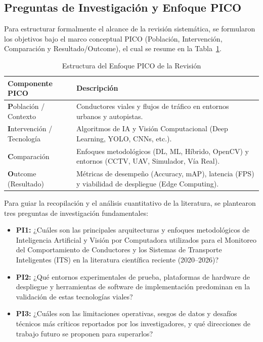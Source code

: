 \subsection{Preguntas de Investigación y Enfoque PICO}
Para estructurar formalmente el alcance de la revisión sistemática, se formularon los objetivos bajo el marco conceptual PICO (Población, Intervención, Comparación y Resultado/Outcome), el cual se resume en la Tabla~\ref{tab:pico}.

\begin{table}[htbp]
\centering
\renewcommand{\arraystretch}{1.3}
\caption{Estructura del Enfoque PICO de la Revisión}
\label{tab:pico}
\begin{tabular}{@{}p{2.2cm}p{6.2cm}@{}}
\toprule
\textbf{Componente PICO} & \textbf{Descripción} \\
\midrule
\textbf{P}oblación / Contexto & Conductores viales y flujos de tráfico en entornos urbanos y autopistas. \\
\textbf{I}ntervención / Tecnología & Algoritmos de IA y Visión Computacional (Deep Learning, YOLO, CNNs, etc.). \\
\textbf{C}omparación & Enfoques metodológicos (DL, ML, Híbrido, OpenCV) y entornos (CCTV, UAV, Simulador, Vía Real). \\
\textbf{O}utcome (Resultado) & Métricas de desempeño (Accuracy, mAP), latencia (FPS) y viabilidad de despliegue (Edge Computing). \\
\bottomrule
\end{tabular}
\end{table}

Para guiar la recopilación y el análisis cuantitativo de la literatura, se plantearon tres preguntas de investigación fundamentales:
\begin{itemize}
    \item \textbf{PI1:} ¿Cuáles son las principales arquitecturas y enfoques metodológicos de Inteligencia Artificial y Visión por Computadora utilizados para el Monitoreo del Comportamiento de Conductores y los Sistemas de Transporte Inteligentes (ITS) en la literatura científica reciente (2020--2026)?
    \item \textbf{PI2:} ¿Qué entornos experimentales de prueba, plataformas de hardware de despliegue y herramientas de software de implementación predominan en la validación de estas tecnologías viales?
    \item \textbf{PI3:} ¿Cuáles son las limitaciones operativas, sesgos de datos y desafíos técnicos más críticos reportados por los investigadores, y qué direcciones de trabajo futuro se proponen para superarlos?
\end{itemize}

